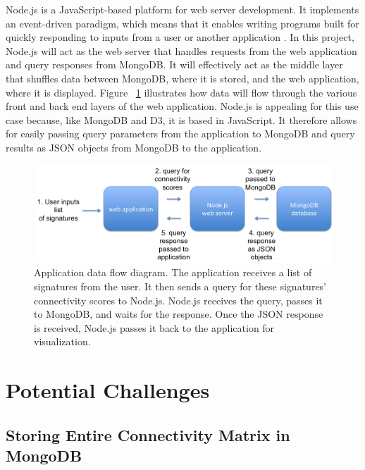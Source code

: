 \documentclass[12pt]{article}
\begin{document}
Node.js is a JavaScript-based platform for web server development. It implements an event-driven paradigm, which means that it enables writing programs built for quickly responding to inputs from a user or another application \cite{node}. In this project, Node.js will act as the web server that handles requests from the web application and query responses from MongoDB. It will effectively act as the middle layer that shuffles data between MongoDB, where it is stored, and the web application, where it is displayed. Figure ~\ref{fig:app_data_flow} illustrates how data will flow through the various front and back end layers of the web application. Node.js is appealing for this use case because, like MongoDB and D3, it is based in JavaScript. It therefore allows for easily passing query parameters from the application to MongoDB and query results as JSON objects from MongoDB to the application.

\begin{figure}[h]
\centering
\includegraphics[scale=0.5]{img/app_data_flow}
\caption{ Application data flow diagram. The application receives a list of signatures from the user. It then sends a query for these signatures' connectivity scores to Node.js. Node.js receives the query, passes it to MongoDB, and waits for the response. Once the JSON response is received, Node.js passes it back to the application for visualization.}
\label{fig:app_data_flow}
\end{figure}

\section{Potential Challenges}
\subsection{Storing Entire Connectivity Matrix in MongoDB}
\end{document}
